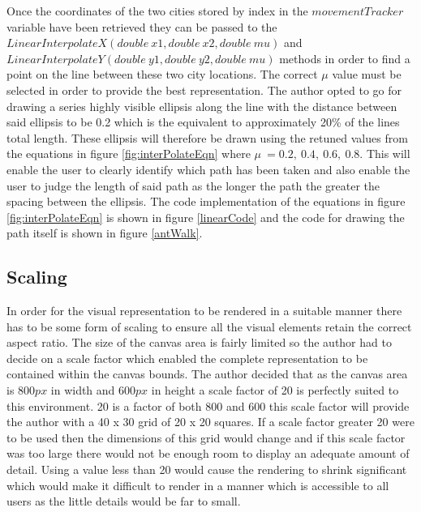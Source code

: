 Once the coordinates of the two cities stored by index in the $movementTracker$ variable have been retrieved they can be passed to the $LinearInterpolateX(double\ x1, double\ x2, double\ mu)$ and $LinearInterpolateY(double\ y1, double\ y2, double\ mu)$ methods in order to find a point on the line between these two city locations. The correct $\mu$ value must be selected in order to provide the best representation. The author opted to go for drawing a series highly visible ellipsis along the line with the distance between said ellipsis to be 0.2 which is the equivalent to approximately 20\% of the lines total length. These ellipsis will therefore be drawn using the retuned values from the equations in figure \ref{fig:interPolateEqn} where $\mu\ = 0.2,\ 0.4,\ 0.6,\ 0.8$. This will enable the user to clearly identify which path has been taken and also enable the user to judge the length of said path as the longer the path the greater the spacing between the ellipsis. The code implementation of the equations in figure \ref{fig:interPolateEqn} is shown in figure \ref{linearCode} and the code for drawing the path itself is shown in figure \ref{antWalk}.

\subsection{Scaling}
\label{scaley}
In order for the visual representation to be rendered in a suitable manner there has to be some form of scaling to ensure all the visual elements retain the correct aspect ratio. The size of the canvas area is fairly limited so the author had to decide on a scale factor which enabled the complete representation to be contained within the canvas bounds. The author decided that as the canvas area is $800px$ in width and $600px$ in height a scale factor of 20 is perfectly suited to this environment. 20 is a factor of both 800 and 600 this scale factor will provide the author with a 40 x 30 grid of 20 x 20 squares. If a scale factor greater 20 were to be used then the dimensions of this grid would change and if this scale factor was too large there would not be enough room to display an adequate amount of detail. Using a value less than 20 would cause the rendering to shrink significant which would make it difficult to render in a manner which is accessible to all users as the little details would be far to small.

